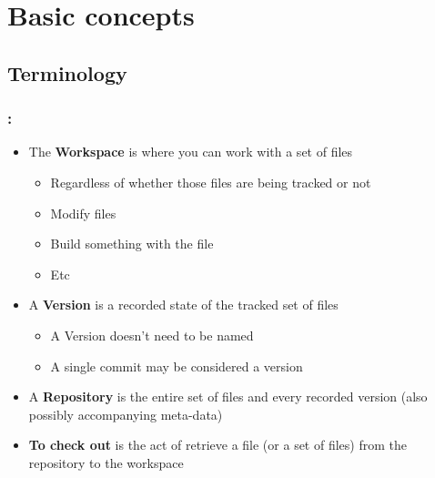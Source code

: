 \section{Basic concepts}

\subsection{Terminology}
\begin{frame}
    \frametitle{\secname: \small\subsecname\normalsize}

    \begin{itemize}
        \item The \textbf{Workspace} is where you can work with a set of files
        \begin{itemize}
            \item Regardless of whether those files are being tracked or not
            \item Modify files
            \item Build something with the file
            \item Etc
        \end{itemize}
        \item A \textbf{Version} is a recorded state of the tracked set of files
        \begin{itemize}
            \item A Version doesn't need to be named
            \item A single commit may be considered a version
        \end{itemize}
        \item A \textbf{Repository} is the entire set of files and every recorded version (also possibly accompanying meta-data)
        \item \textbf{To check out} is the act of retrieve a file (or a set of files) from the repository to the workspace
    \end{itemize}
\end{frame}

